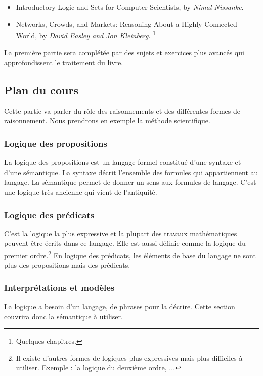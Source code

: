 \begin{itemize}
\item Introductory Logic and Sets for Computer Scientists, by \textit{Nimal Nissanke}.
\item Networks, Crowds, and Markets: Reasoning About a Highly Connected World, by \textit{David Easley and Jon Kleinberg}. \footnote{Quelques chapitres.}
\end{itemize}

La première partie sera complétée par des sujets et exercices plus avancés qui approfondissent le traitement du livre.

\subsection{Plan du cours}

Cette partie va parler du rôle des raisonnements et des différentes formes de raisonnement. Nous prendrons en exemple la méthode scientifique.

\subsubsection{Logique des propositions}

La logique des propositions est un langage formel constitué d'une syntaxe et d'une sémantique. La syntaxe décrit l'ensemble des formules qui appartiennent au langage. La sémantique permet de donner un sens aux formules de langage. C'est une logique très ancienne qui vient de l'antiquité. 

\subsubsection{Logique des prédicats}

C'est la logique la plus expressive et la plupart des travaux mathématiques peuvent être écrits dans ce langage. Elle est aussi définie comme la logique du premier ordre.\footnote{Il existe d'autres formes de logiques plus expressives mais plus difficiles à utiliser. Exemple : la logique du deuxième ordre, ...} En logique des prédicats, les éléments de base du langage ne sont plus des propositions mais des prédicats. 

\subsubsection{Interprétations et modèles}

La logique a besoin d'un langage, de phrases pour la décrire. Cette section couvrira donc la sémantique à utiliser.

